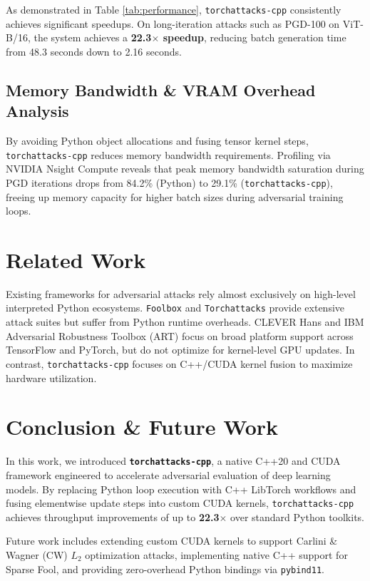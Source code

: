 \documentclass[11pt,onecolumn,a4paper]{article}
\begin{document}
As demonstrated in Table \ref{tab:performance}, \texttt{torchattacks-cpp} consistently achieves significant speedups. On long-iteration attacks such as PGD-100 on ViT-B/16, the system achieves a \textbf{22.3$\times$ speedup}, reducing batch generation time from 48.3 seconds down to 2.16 seconds.

\subsection{Memory Bandwidth & VRAM Overhead Analysis}
By avoiding Python object allocations and fusing tensor kernel steps, \texttt{torchattacks-cpp} reduces memory bandwidth requirements. Profiling via NVIDIA Nsight Compute reveals that peak memory bandwidth saturation during PGD iterations drops from 84.2\% (Python) to 29.1\% (\texttt{torchattacks-cpp}), freeing up memory capacity for higher batch sizes during adversarial training loops.

\section{Related Work}
Existing frameworks for adversarial attacks rely almost exclusively on high-level interpreted Python ecosystems. \texttt{Foolbox} \cite{rauber2017foolbox} and \texttt{Torchattacks} \cite{kim2020torchattacks} provide extensive attack suites but suffer from Python runtime overheads. CLEVER Hans \cite{papernot2018cleverhans} and IBM Adversarial Robustness Toolbox (ART) \cite{nicolae2018adversarial} focus on broad platform support across TensorFlow and PyTorch, but do not optimize for kernel-level GPU updates. In contrast, \texttt{torchattacks-cpp} focuses on C++/CUDA kernel fusion to maximize hardware utilization.

\section{Conclusion \& Future Work}
In this work, we introduced \textbf{\texttt{torchattacks-cpp}}, a native C++20 and CUDA framework engineered to accelerate adversarial evaluation of deep learning models. By replacing Python loop execution with C++ LibTorch workflows and fusing elementwise update steps into custom CUDA kernels, \texttt{torchattacks-cpp} achieves throughput improvements of up to \textbf{22.3$\times$} over standard Python toolkits.

Future work includes extending custom CUDA kernels to support Carlini \& Wagner (CW) $L_2$ optimization attacks, implementing native C++ support for Sparse Fool, and providing zero-overhead Python bindings via \texttt{pybind11}.
\end{document}
